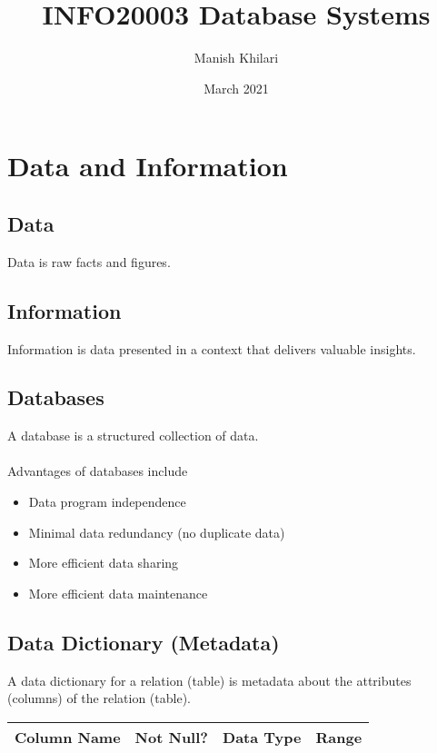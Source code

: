 \documentclass[11pt, a4paper]{article}
\title{INFO20003 Database Systems}
\author{Manish Khilari}
\date{March 2021}
\begin{document}
    
    \maketitle

    \section{Data and Information}
    \subsection{Data}
    Data is raw facts and figures. 

    \subsection{Information}
    Information is data presented in a context that delivers valuable insights. 

    \subsection{Databases}
    A database is a structured collection of data. \\\\
    Advantages of databases include 
    \begin{itemize}
        \item Data program independence 
        \item Minimal data redundancy (no duplicate data) 
        \item More efficient data sharing 
        \item More efficient data maintenance 
    \end{itemize}

    \subsection{Data Dictionary (Metadata)}
    A data dictionary for a relation (table) is metadata about the attributes 
    (columns) of the relation (table). 
    \begin{center}
        \begin{tabular}{ |c|c|c|c| } 
         \hline
         Column Name & Not Null? & Data Type & Range \\ 
         \hline
        \end{tabular}
    \end{center}
    
\end{document}
